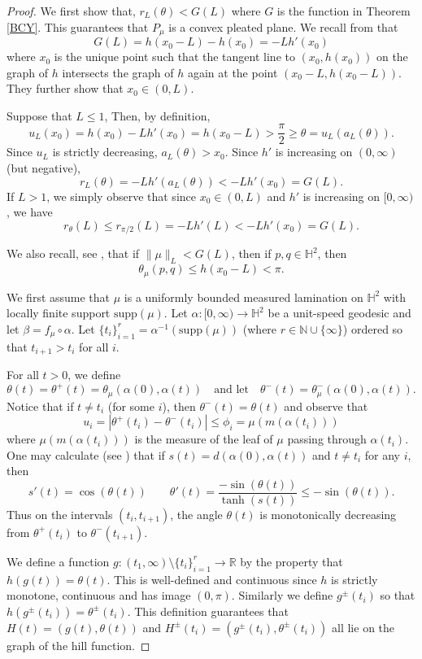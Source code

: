 \documentclass{amsart}
\theoremstyle{plain}
\theoremstyle{definition}
\theoremstyle{remark}
\newcommand{\R}{\mathbb R}
\newcommand{\Hp}{{\mathbb H}^2}
\newcommand{\<}{\left <}
\renewcommand{\>}{\right >}
\begin{document}
\begin{proof}
We first show that, $r_L(\theta) < G(L)$ where $G$ is the function in Theorem \ref{BCY}. 
This guarantees that $P_\mu$ is a convex pleated plane.
We recall from \cite{BCY} that
$$G(L) = h(x_0-L)-h(x_0) = -Lh'(x_0)$$ 
where  $x_0$  is the unique point such that the tangent line to $(x_0,h(x_0))$ on the graph of $h$  intersects the graph of
$h$ again at the point $(x_0-L, h(x_0-L))$. They further show that $x_0 \in (0,L).$  

Suppose that $L\le1$, Then, by definition,
$$u_L(x_0)=h(x_0)-Lh'(x_0)=h(x_0-L) > \frac{\pi}{2} \geq \theta = u_L(a_L(\theta)).$$
Since $u_L$ is strictly decreasing, $a_L(\theta)>x_0$.
Since $h'$ is increasing on $(0,\infty)$ (but negative),
$$r_L(\theta) =-Lh'(a_L(\theta))  < -L h'(x_0) = G(L).$$
If $L>1$,  we simply observe that since $x_0\in (0,L)$ and $h'$ is increasing on $[0,\infty)$, we have
$$r_\theta(L)\le r_{\pi/2}(L)=-Lh'(L)<-Lh'(x_0)=G(L).$$


We also recall, see \cite[Lemma 4.3]{BCY}, that
if $\|\mu\|_L < G(L)$, then if $p,q\in\Hp$, then
$$\theta_\mu(p,q)\le h(x_0-L)<\pi.$$

We first assume that $\mu$ is a uniformly bounded measured lamination on $\mathbb H^2$ with locally finite support $\mathrm{supp}(\mu)$.
Let $\alpha:[0,\infty)\to\Hp$ be a unit-speed geodesic and  let $\beta=f_\mu\circ \alpha$.
Let $\{t_i\}_{i=1}^r=\alpha^{-1}(\mathrm{supp}(\mu))$ (where $r\in\mathbb N\cup\{\infty\}$) ordered so that $t_{i+1}>t_i$ for all $i$.

For all $t>0$, we define
$$\theta(t)=\theta^+(t)=\theta_\mu(\alpha(0),\alpha(t))\quad\text{and let}\quad\theta^-(t)=\theta^-_\mu(\alpha(0),\alpha(t)).$$
Notice that if $t\ne t_i$ (for some $i$), then $\theta^-(t)=\theta(t)$ and observe that
$$u_i = |\theta^+(t_i)-\theta^-(t_i)| \leq \phi_i=\mu(m(\alpha(t_i)))$$
where $\mu(m(\alpha(t_i)))$ is the measure of the leaf of $\mu$ passing through $\alpha(t_i)$.
One may calculate (see \cite[Lemma 4.4]{EMM}) that if $s(t) = d(\alpha(0),\alpha(t))$ and $t\ne t_i$ for any $i$, then
$$s'(t) = \cos(\theta(t)) \qquad \theta'(t) = \frac{-\sin(\theta(t))}{\tanh(s(t))} \leq -\sin(\theta(t)).$$
Thus on the intervals $(t_i,t_{i+1})$, the angle $\theta(t)$ is monotonically decreasing from $\theta^+(t_i)$ to $\theta^-(t_{i+1})$. 

We define a function $g:(t_1,\infty)\setminus \{t_i\}_{i=1}^r\to\R$  by the property that $h(g(t)) = \theta(t)$. 
This is well-defined and continuous  since $h$ is strictly monotone, continuous and has image $(0,\pi)$.
Similarly we define $g^\pm(t_i)$ so that $h(g^\pm(t_i)) = \theta^\pm(t_i)$.
This definition guarantees that $H(t)=(g(t),\theta(t))$ and $H^\pm(t_i)=(g^\pm(t_i),\theta^\pm(t_i))$ all lie on the graph of the hill function.


\end{proof}
\end{document}
